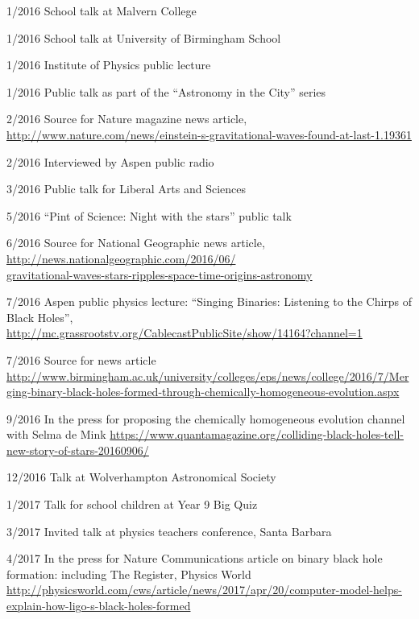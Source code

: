 \documentclass[margin,line]{res}
\begin{document}
\begin{resume}
1/2016 	School talk at Malvern College

1/2016 	School talk at University of Birmingham School

1/2016	Institute of Physics public lecture

1/2016	Public talk as part of the ``Astronomy in the City'' series

2/2016	Source for Nature magazine news article,\\ \url{http://www.nature.com/news/einstein-s-gravitational-waves-found-at-last-1.19361}

2/2016	Interviewed by Aspen public radio

3/2016	Public talk for Liberal Arts and Sciences 

5/2016	``Pint of Science: Night with the stars'' public talk

6/2016	Source for National Geographic news article,\\ \url{http://news.nationalgeographic.com/2016/06/}\\\url{gravitational-waves-stars-ripples-space-time-origins-astronomy}

7/2016	Aspen public physics lecture: ``Singing Binaries: Listening to the Chirps of Black Holes'',\\\url{http://mc.grassrootstv.org/CablecastPublicSite/show/14164?channel=1}

7/2016 	Source for news article\\ \url{http://www.birmingham.ac.uk/university/colleges/eps/news/college/2016/7/Merging-binary-black-holes-formed-through-chemically-homogeneous-evolution.aspx}

9/2016 	In the press for proposing the chemically homogeneous evolution channel with Selma de Mink \url{https://www.quantamagazine.org/colliding-black-holes-tell-new-story-of-stars-20160906/}

12/2016	Talk at Wolverhampton Astronomical Society

1/2017	Talk for school children at Year 9 Big Quiz

3/2017	Invited talk at physics teachers conference, Santa Barbara

4/2017	In the press for Nature Communications article on binary black hole formation: including The Register, %
Physics World\\ \url{http://physicsworld.com/cws/article/news/2017/apr/20/computer-model-helps-explain-how-ligo-s-black-holes-formed}


\end{resume}
\end{document}
